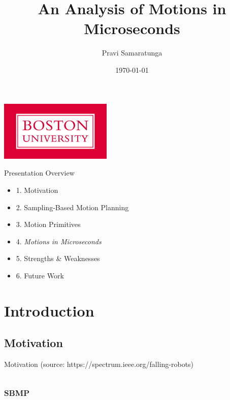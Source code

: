 \documentclass{beamer}
\title[]{An Analysis of Motions in Microseconds}
\author[]{Pravi Samaratunga}
\institute{Boston University ECE}
\date{\today}
\begin{document}
\begin{frame}
   \begin{center}
       \titlepage
     
       \includegraphics[width=0.4\textwidth]{./assets/BU_logo.png}
   \end{center}
\end{frame}

\begin{frame}{Presentation Overview}
\begin{itemize}
\item 1. Motivation \\
\item 2. Sampling-Based Motion Planning \\
\item 3. Motion Primitives \\
\item 4. \textit{Motions in Microseconds} \\
\item 5. Strengths \& Weaknesses\\
\item 6. Future Work \\
\end{itemize}
\end{frame}

\section{Introduction}

\subsection{Motivation}
\begin{frame}{Motivation}
\centering
{}
(source: https://spectrum.ieee.org/falling-robots)
\end{frame}

\subsection{\textsc{sbmp}}
\end{document}
